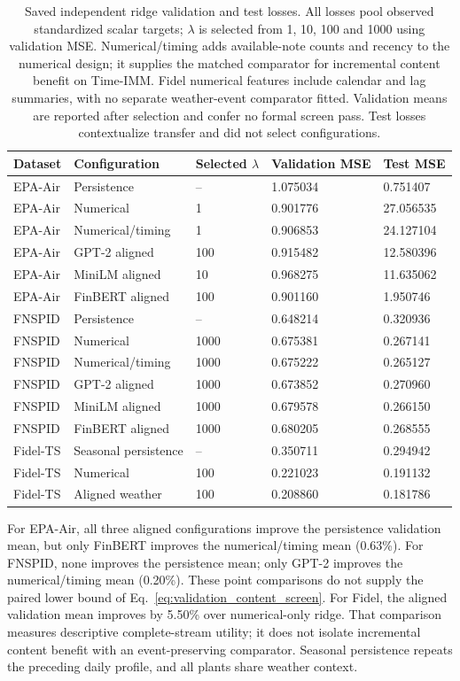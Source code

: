 \begin{table}[htbp]
\centering\footnotesize
\setlength{\tabcolsep}{4pt}
\caption{Saved independent ridge validation and test losses. All losses pool observed standardized scalar targets; $\lambda$ is selected from 1, 10, 100 and 1000 using validation MSE. Numerical/timing adds available-note counts and recency to the numerical design; it supplies the matched comparator for incremental content benefit on Time-IMM. Fidel numerical features include calendar and lag summaries, with no separate weather-event comparator fitted. Validation means are reported after selection and confer no formal screen pass. Test losses contextualize transfer and did not select configurations.}
\label{tab:ridge_capability_details}
\begin{tabular}{lllll}
\toprule
Dataset & Configuration & Selected $\lambda$ & Validation MSE & Test MSE\\
\midrule
EPA-Air & Persistence & -- & 1.075034 & 0.751407\\
EPA-Air & Numerical & 1 & 0.901776 & 27.056535\\
EPA-Air & Numerical/timing & 1 & 0.906853 & 24.127104\\
EPA-Air & GPT-2 aligned & 100 & 0.915482 & 12.580396\\
EPA-Air & MiniLM aligned & 10 & 0.968275 & 11.635062\\
EPA-Air & FinBERT aligned & 100 & 0.901160 & 1.950746\\
FNSPID & Persistence & -- & 0.648214 & 0.320936\\
FNSPID & Numerical & 1000 & 0.675381 & 0.267141\\
FNSPID & Numerical/timing & 1000 & 0.675222 & 0.265127\\
FNSPID & GPT-2 aligned & 1000 & 0.673852 & 0.270960\\
FNSPID & MiniLM aligned & 1000 & 0.679578 & 0.266150\\
FNSPID & FinBERT aligned & 1000 & 0.680205 & 0.268555\\
Fidel-TS & Seasonal persistence & -- & 0.350711 & 0.294942\\
Fidel-TS & Numerical & 100 & 0.221023 & 0.191132\\
Fidel-TS & Aligned weather & 100 & 0.208860 & 0.181786\\
\bottomrule
\end{tabular}
\end{table}

For EPA-Air, all three aligned configurations improve the persistence validation mean, but only FinBERT improves the numerical/timing mean (0.63\%). For FNSPID, none improves the persistence mean; only GPT-2 improves the numerical/timing mean (0.20\%). These point comparisons do not supply the paired lower bound of Eq.~\ref{eq:validation_content_screen}. For Fidel, the aligned validation mean improves by 5.50\% over numerical-only ridge. That comparison measures descriptive complete-stream utility; it does not isolate incremental content benefit with an event-preserving comparator. Seasonal persistence repeats the preceding daily profile, and all plants share weather context.

